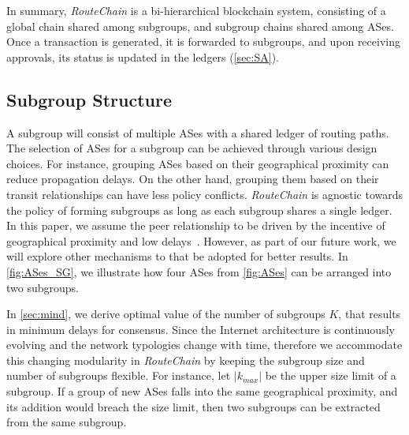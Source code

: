 \documentclass[conference]{IEEEtran}
\newcommand{\rc}{{{\em RouteChain}}\xspace}
\begin{document}
In summary, \rc is a bi-hierarchical blockchain system, consisting of a global chain shared among subgroups, and subgroup chains shared among ASes. Once a transaction is generated, it is forwarded to subgroups, and upon receiving approvals, its status is updated in the ledgers (\textsection\ref{sec:SA}).   


\subsection{Subgroup Structure}\label{sec:sg}

A subgroup will consist of multiple ASes with a shared ledger of routing paths. The selection of ASes for a subgroup can be achieved through various design choices. For instance, grouping ASes based on their geographical proximity can reduce propagation delays. On the other hand, grouping them based on their transit relationships can have less policy conflicts. \rc is agnostic towards the policy of forming subgroups as long as each subgroup shares a single ledger. In this paper, we assume the peer relationship to be driven by the incentive of geographical proximity and low delays~\cite{rfc1930}. However, as part of our future work, we will explore other mechanisms to that be adopted for better results. In \autoref{fig:ASes_SG}, we illustrate how four ASes from \autoref{fig:ASes} can be arranged into two subgroups. 

In \textsection\ref{sec:mind}, we derive optimal value of the number of subgroups $K$, that results in minimum delays for consensus. Since the Internet architecture is continuously evolving and the network typologies change with time, therefore we accommodate this changing modularity in \rc by keeping the subgroup size and number of subgroups flexible. For instance, let $|k_{max}|$ be the upper size limit of a subgroup. If a group of new ASes falls into the same geographical proximity, and its addition would breach the size limit, then two subgroups can be extracted from the same subgroup.  
\end{document}
